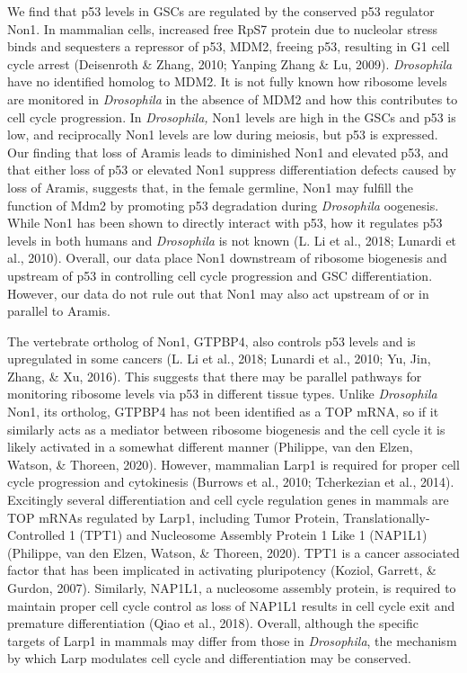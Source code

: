 \documentclass[12pt,oneside]{reedthesis}
\begin{document}
We find that p53 levels in GSCs are regulated by the conserved p53 regulator Non1. In mammalian cells, increased free RpS7 protein due to nucleolar stress binds and sequesters a repressor of p53, MDM2, freeing p53, resulting in G1 cell cycle arrest (Deisenroth \& Zhang, 2010; Yanping Zhang \& Lu, 2009). \emph{Drosophila} have no identified homolog to MDM2. It is not fully known how ribosome levels are monitored in \emph{Drosophila} in the absence of MDM2 and how this contributes to cell cycle progression. In \emph{Drosophila,} Non1 levels are high in the GSCs and p53 is low, and reciprocally Non1 levels are low during meiosis, but p53 is expressed. Our finding that loss of Aramis leads to diminished Non1 and elevated p53, and that either loss of p53 or elevated Non1 suppress differentiation defects caused by loss of Aramis, suggests that, in the female germline, Non1 may fulfill the function of Mdm2 by promoting p53 degradation during \emph{Drosophila} oogenesis. While Non1 has been shown to directly interact with p53, how it regulates p53 levels in both humans and \emph{Drosophila} is not known (L. Li et al., 2018; Lunardi et al., 2010). Overall, our data place Non1 downstream of ribosome biogenesis and upstream of p53 in controlling cell cycle progression and GSC differentiation. However, our data do not rule out that Non1 may also act upstream of or in parallel to Aramis.

The vertebrate ortholog of Non1, GTPBP4, also controls p53 levels and is upregulated in some cancers (L. Li et al., 2018; Lunardi et al., 2010; Yu, Jin, Zhang, \& Xu, 2016). This suggests that there may be parallel pathways for monitoring ribosome levels via p53 in different tissue types. Unlike \emph{Drosophila} Non1, its ortholog, GTPBP4 has not been identified as a TOP mRNA, so if it similarly acts as a mediator between ribosome biogenesis and the cell cycle it is likely activated in a somewhat different manner (Philippe, van den Elzen, Watson, \& Thoreen, 2020). However, mammalian Larp1 is required for proper cell cycle progression and cytokinesis (Burrows et al., 2010; Tcherkezian et al., 2014). Excitingly several differentiation and cell cycle regulation genes in mammals are TOP mRNAs regulated by Larp1, including Tumor Protein, Translationally-Controlled 1 (TPT1) and Nucleosome Assembly Protein 1 Like 1 (NAP1L1) (Philippe, van den Elzen, Watson, \& Thoreen, 2020). TPT1 is a cancer associated factor that has been implicated in activating pluripotency (Koziol, Garrett, \& Gurdon, 2007). Similarly, NAP1L1, a nucleosome assembly protein, is required to maintain proper cell cycle control as loss of NAP1L1 results in cell cycle exit and premature differentiation (Qiao et al., 2018). Overall, although the specific targets of Larp1 in mammals may differ from those in \emph{Drosophila}, the mechanism by which Larp modulates cell cycle and differentiation may be conserved.
\end{document}
